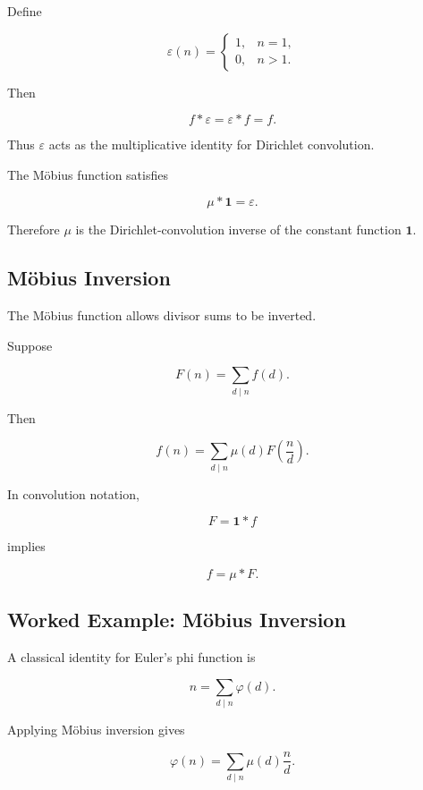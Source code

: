 Define

\[
\varepsilon(n)=
\begin{cases}
1, & n=1,\\
0, & n>1.
\end{cases}
\]

Then

\[ f*\varepsilon=\varepsilon*f=f. \]

Thus \(\varepsilon\) acts as the multiplicative identity for Dirichlet
convolution.

The Möbius function satisfies

\[ \boxed{\mu*\mathbf{1}=\varepsilon.} \]

Therefore \(\mu\) is the Dirichlet-convolution inverse of the constant
function \(\mathbf{1}\).

\subsection{Möbius Inversion}
\label{subsec:mobius-inversion}

The Möbius function allows divisor sums to be inverted.

\begin{theorem}
Suppose

\[ F(n)=\sum_{d\mid n}f(d). \]

Then

\[ \boxed{f(n)=\sum_{d\mid n}\mu(d)F\left(\frac nd\right).} \]
\end{theorem}

In convolution notation,

\[ F=\mathbf{1}*f \]

implies

\[ f=\mu*F. \]

\subsection{Worked Example: Möbius Inversion}
\label{subsec:worked-mobius-inversion}

A classical identity for Euler's phi function is

\[ n=\sum_{d\mid n}\varphi(d). \]

Applying Möbius inversion gives

\[ \varphi(n)=\sum_{d\mid n}\mu(d)\frac nd. \]

